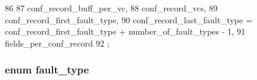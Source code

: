 \begin{DoxyCode}
86     {
87         conf_record_buff_per_vc,
88         conf_record_vcs,
89         conf_record_first_fault_type,
90         conf_record_last_fault_type = conf_record_first_fault_type + 
      number_of_fault_types - 1,
91         fields_per_conf_record
92     };
\end{DoxyCode}
\hypertarget{classFaultModel_ad671111bc5a7e95e40340cfe3fb42f5f}{
\subsubsection[{fault\_\-type}]{\setlength{\rightskip}{0pt plus 5cm}enum {\bf fault\_\-type}}}
\label{classFaultModel_ad671111bc5a7e95e40340cfe3fb42f5f}
